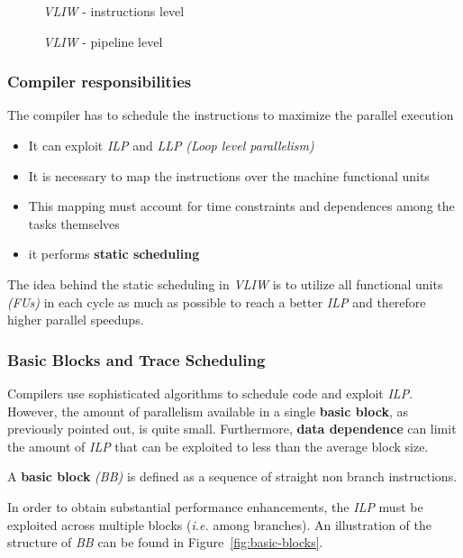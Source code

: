 \documentclass[english]{article}
\begin{document}
\begin{figure}[htbp]
  \bigskip
  \centering
  \caption{\textit{VLIW} - instructions level}
  \label{fig:vliw-instruction-level}
  \bigskip
\end{figure}

\begin{figure}[htbp]
  \bigskip
  \centering
  \caption{\textit{VLIW} - pipeline level}
  \label{fig:vliw-pipeline-level}
  \bigskip
\end{figure}

\subsubsection{Compiler responsibilities}

The compiler has to schedule the instructions to maximize the parallel execution
\begin{itemize}
  \item It can exploit \textit{ILP} and \textit{LLP} \textit{(Loop level parallelism)}
  \item It is necessary to map the instructions over the machine functional units
  \item This mapping must account for time constraints and  dependences among the tasks themselves
  \item it performs \textbf{static scheduling}
\end{itemize}

The idea behind the static scheduling in \textit{VLIW} is to utilize all functional units \textit{(FUs)} in each cycle as much as possible to reach a better \textit{ILP} and therefore higher parallel speedups.

\subsubsection{Basic Blocks and Trace Scheduling}
\label{sec:trace-scheduling}

Compilers use sophisticated algorithms to schedule code and exploit \textit{ILP}.
However, the amount of parallelism available in a single \textbf{basic block}, as previously pointed out, is quite small.
Furthermore, \textbf{data dependence} can limit the amount of \textit{ILP} that can be exploited to less than the average block size.

A \textbf{basic block} \textit{(BB)} is defined as a sequence of straight non branch instructions.

In order to obtain substantial performance enhancements, the \textit{ILP} must be exploited across multiple blocks (\textit{i.e.} among branches).
An illustration of the structure of \textit{BB} can be found in Figure~\ref{fig:basic-blocks}.
\end{document}
